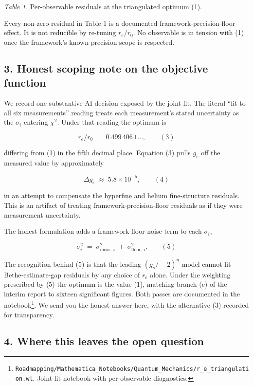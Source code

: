 \documentclass[
  11pt,
]{article}
\begin{document}
\emph{Table 1.} Per-observable residuals at the triangulated optimum
(1).

Every non-zero residual in Table 1 is a documented
framework-precision-floor effect. It is not reducible by re-tuning
\(r_e/r_0\). No observable is in tension with (1) once the framework's
known precision scope is respected.

\hypertarget{honest-scoping-note-on-the-objective-function}{%
\subsection{3. Honest scoping note on the objective
function}\label{honest-scoping-note-on-the-objective-function}}

We record one substantive-AI decision exposed by the joint fit. The
literal ``fit to all six measurements'' reading treats each
measurement's stated uncertainty as the \(\sigma_i\) entering
\(\chi^2\). Under that reading the optimum is

\[
r_e/r_0 \;=\; 0.499\,406\,1\ldots,
\qquad (3)
\]

differing from (1) in the fifth decimal place. Equation (3) pulls
\(g_e\) off the measured value by approximately

\[
\Delta g_e \;\approx\; 5.8 \times 10^{-5},
\qquad (4)
\]

in an attempt to compensate the hyperfine and helium fine-structure
residuals. This is an artifact of treating framework-precision-floor
residuals as if they were measurement uncertainty.

The honest formulation adds a framework-floor noise term to each
\(\sigma_i\),

\[
\sigma_i^{2} \;=\; \sigma_{\text{meas},\,i}^{2} \;+\; \sigma_{\text{floor},\,i}^{2}.
\qquad (5)
\]

The recognition behind (5) is that the leading \((g_s/-2)^n\) model
cannot fit Bethe-estimate-gap residuals by any choice of \(r_e\) alone.
Under the weighting prescribed by (5) the optimum is the value (1),
matching branch (c) of the interim report to sixteen significant
figures. Both passes are documented in the notebook\footnote{\texttt{Roadmapping/Mathematica\_Notebooks/Quantum\_Mechanics/r\_e\_triangulation.wl}.
  Joint-fit notebook with per-observable diagnostics.}. We send you the
honest answer here, with the alternative (3) recorded for transparency.

\hypertarget{where-this-leaves-the-open-question}{%
\subsection{4. Where this leaves the open
question}\label{where-this-leaves-the-open-question}}
\end{document}
